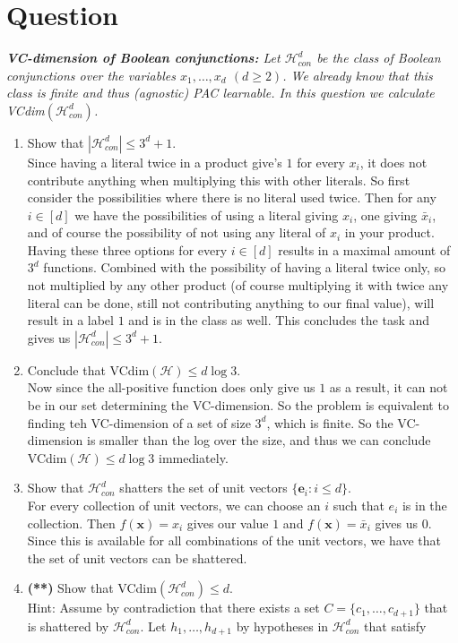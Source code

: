 \documentclass{article}
\newcounter{counterquestion}
\newenvironment{question}[1]
{
\stepcounter{counterquestion}
\section*{Question \thecounterquestion}
\textit{#1} 
} 
{
}
\begin{document}
\begin{question}{\textbf{VC-dimension of Boolean conjunctions:} Let $\mathcal{H} ^d _{con}$ be the class of Boolean conjunctions over the variables $x_1, \dots , x_d$ $(d\geq 2)$. We already know that this class is finite and thus (agnostic) PAC learnable. In this question we calculate VCdim$(\mathcal{H}^d _{con} )$.}
\begin{enumerate}
\item Show that $| \mathcal{H}^d _{con} | \leq 3^d +1$.\\
Since having a literal twice in a product give's $1$ for every $x_i$, it does not contribute anything when multiplying this with other literals. So first consider the possibilities where there is no literal used twice. Then for any $i\in [d]$ we have the possibilities of using a literal giving $x_i$, one giving $\bar{x}_i$, and of course the possibility of not using any literal of $x_i$ in your product. Having these three options for every $i\in [d]$ results in a maximal amount of $3^d$ functions. Combined with the possibility of having a literal twice only, so not multiplied by any other product (of course multiplying it with twice any literal can be done, still not contributing anything to our final value), will result in a label $1$ and is in the class as well. This concludes the task and gives us $|\mathcal{H} ^d _{con} | \leq 3^d +1$.
\item Conclude that VCdim$(\mathcal{H} ) \leq d \log 3$.\\
Now since the all-positive function does only give us $1$ as a result, it can not be in our set determining the VC-dimension. So the problem is equivalent to finding teh VC-dimension of a set of size $3^d$, which is finite. So the VC-dimension is smaller than the log over the size, and thus we can conclude VCdim$(\mathcal{H} ) \leq d \log 3$ immediately.
\item Show that $\mathcal{H}^d _{con}$ shatters the set of unit vectors $\{ \textbf{e}_i : i\leq d \}$.\\
For every collection of unit vectors, we can choose an $i$ such that $e_i$ is in the collection. Then $f(\textbf{x})=x_i$ gives our value $1$ and $f(\textbf{x})=\bar{x}_i$ gives us $0$. Since this is available for all combinations of the unit vectors, we have that the set of unit vectors can be shattered.
\item \textbf{(**)} Show that VCdim$(\mathcal{H}^d _{con} )\leq d$.\\
Hint: Assume by contradiction that there exists a set $C= \{ c_1, \dots , c_{d+1} \}$ that is shattered by $\mathcal{H} ^d _{con}$. Let $h_1, \dots , h_{d+1}$ by hypotheses in $\mathcal{H} ^d _{con}$ that satisfy

\end{enumerate}
\end{question}
\end{document}
